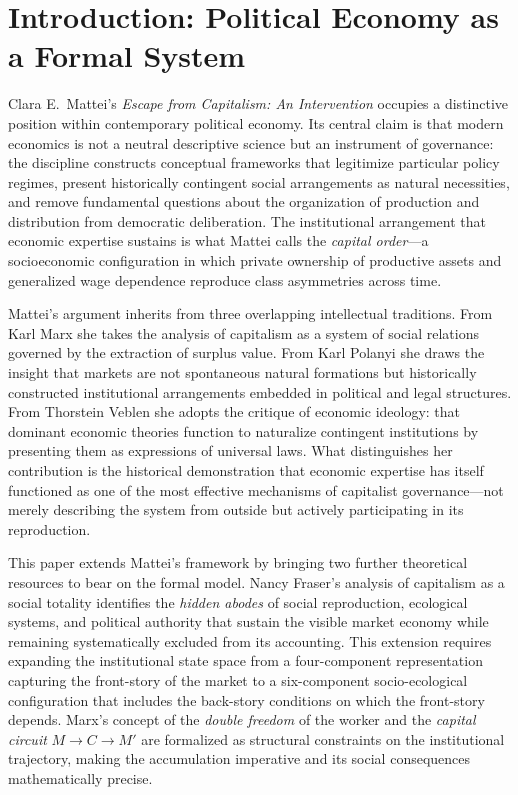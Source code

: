 \documentclass[12pt,a4paper]{article}
\theoremstyle{definition}
\theoremstyle{remark}
\begin{document}
\tableofcontents
\newpage

\section{Introduction: Political Economy as a Formal System}

Clara E.\ Mattei's \emph{Escape from Capitalism: An Intervention} occupies a distinctive position within contemporary political economy. Its central claim is that modern economics is not a neutral descriptive science but an instrument of governance: the discipline constructs conceptual frameworks that legitimize particular policy regimes, present historically contingent social arrangements as natural necessities, and remove fundamental questions about the organization of production and distribution from democratic deliberation. The institutional arrangement that economic expertise sustains is what Mattei calls the \emph{capital order}---a socioeconomic configuration in which private ownership of productive assets and generalized wage dependence reproduce class asymmetries across time.

Mattei's argument inherits from three overlapping intellectual traditions. From Karl Marx she takes the analysis of capitalism as a system of social relations governed by the extraction of surplus value. From Karl Polanyi she draws the insight that markets are not spontaneous natural formations but historically constructed institutional arrangements embedded in political and legal structures. From Thorstein Veblen she adopts the critique of economic ideology: that dominant economic theories function to naturalize contingent institutions by presenting them as expressions of universal laws. What distinguishes her contribution is the historical demonstration that economic expertise has itself functioned as one of the most effective mechanisms of capitalist governance---not merely describing the system from outside but actively participating in its reproduction.

This paper extends Mattei's framework by bringing two further theoretical resources to bear on the formal model. Nancy Fraser's analysis of capitalism as a social totality identifies the \emph{hidden abodes} of social reproduction, ecological systems, and political authority that sustain the visible market economy while remaining systematically excluded from its accounting. This extension requires expanding the institutional state space from a four-component representation capturing the front-story of the market to a six-component socio-ecological configuration that includes the back-story conditions on which the front-story depends. Marx's concept of the \emph{double freedom} of the worker and the \emph{capital circuit} $M \to C \to M'$ are formalized as structural constraints on the institutional trajectory, making the accumulation imperative and its social consequences mathematically precise.
\end{document}
